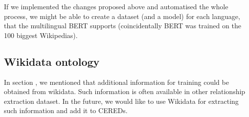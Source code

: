 If we implemented the changes proposed above and automatised the whole process, we might be able to create a dataset (and a model) for each language, that the multilingual BERT supports (coincidentally BERT was trained on the 100 biggest Wikipedias).

\subsection{Wikidata ontology}
In section , we mentioned that additional information for training could be obtained from wikidata. Such information is often available in other relationship extraction dataset. In the future, we would like to use Wikidata for extracting such information and add it to CEREDs.


